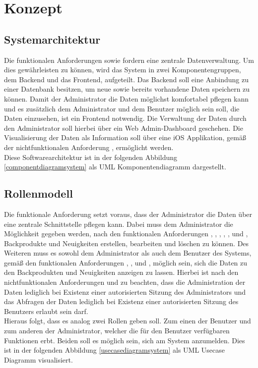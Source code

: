 \chapter{Konzept}

\section{Systemarchitektur} \label{systemarchitektur}
Die funktionalen Anforderungen  sowie  fordern eine zentrale Datenverwaltung.
Um dies gewährleisten zu können, wird das System in zwei Komponentengruppen, dem Backend und das Frontend, aufgeteilt.
Das Backend soll eine Anbindung zu einer Datenbank besitzen, um neue sowie bereits vorhandene Daten speichern zu können.
Damit der Administrator die Daten möglichst komfortabel pflegen kann und es zusätzlich dem Administrator und dem Benutzer möglich sein soll, die Daten einzusehen, ist ein Frontend notwendig. Die Verwaltung der Daten durch den Administrator soll hierbei über ein Web Admin-Dashboard geschehen. Die Visualisierung der Daten als Information soll über eine iOS Applikation, gemäß der nichtfunktionalen Anforderung , ermöglicht werden.
\\
Diese Softwarearchitektur ist in der folgenden Abbildung \ref{componentdiagramsystem} als UML Komponentendiagramm dargestellt.


\clearpage

\section{Rollenmodell} \label{rollenmodell}
Die funktionale Anforderung  setzt voraus, dass der Administrator die Daten über eine zentrale Schnittstelle pflegen kann. Dabei muss dem Administrator die Möglichkeit gegeben werden, nach den funktionalen Anforderungen , , , , , und , Backprodukte und Neuigkeiten erstellen, bearbeiten und löschen zu können.
Des Weiteren muss es sowohl dem Administrator als auch dem Benutzer des Systems, gemäß den funktionalen Anforderungen , ,  und , möglich sein, sich die Daten zu den Backprodukten und Neuigkeiten anzeigen zu lassen. Hierbei ist nach den nichtfunktionalen Anforderungen  und  zu beachten, dass die Administration der Daten lediglich bei Existenz einer autorisierten Sitzung des Administrators und das Abfragen der Daten lediglich bei Existenz einer autorisierten Sitzung des Benutzers erlaubt sein darf.
\\
Hieraus folgt, dass es analog zwei Rollen geben soll. Zum einen der Benutzer und zum anderen der Administrator, welcher die für den Benutzer verfügbaren Funktionen erbt. Beiden soll es möglich sein, sich am System anzumelden.
Dies ist in der folgenden Abbildung \ref{usecasediagramsystem} als UML Usecase Diagramm visualisiert.

